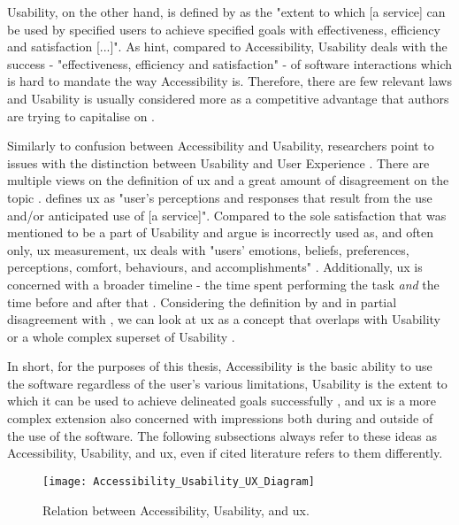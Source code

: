 Usability, on the other hand, is defined by \textcite{ISO_9241-11:2018} as the "extent to which [a service] can be used by specified users to achieve specified goals with effectiveness, efficiency and satisfaction [...]".
As \textcite{Wegge_Zimmermann_2007} hint, compared to Accessibility, Usability deals with the success - "effectiveness, efficiency and satisfaction" \parencite{ISO_9241-11:2018} - of software interactions which is hard to mandate the way Accessibility is.
Therefore, there are few relevant laws and Usability is usually considered more as a competitive advantage that authors are trying to capitalise on \parencite{Wegge_Zimmermann_2007}.

Similarly to confusion between Accessibility and Usability, researchers point to issues with the distinction between Usability and User Experience \parencite{Darin_et_all_2019, Juergen_et_all_2020}.
There are multiple views on the definition of \gls{ux} and a great amount of disagreement on the topic \parencite{Juergen_et_all_2020}.
\textcite{ISO_9241-11:2018} defines \gls{ux} as "user’s perceptions and responses that result from the use and/or anticipated use of [a service]".
Compared to the sole satisfaction that was mentioned to be a part of Usability and \textcite{Darin_et_all_2019} argue is incorrectly used as, and often only, \gls{ux} measurement, \gls{ux} deals with "users’ emotions, beliefs, preferences, perceptions, comfort, behaviours, and accomplishments" \parencite{ISO_9241-11:2018}.
Additionally, \gls{ux} is concerned with a broader timeline - the time spent performing the task \emph{and} the time before and after that \parencite{Juergen_et_all_2020,ISO_9241-11:2018}.
Considering the definition by \textcite{ISO_9241-11:2018} and in partial disagreement with \textcite{Darin_et_all_2019}, we can look at \gls{ux} as a concept that overlaps with Usability or a whole complex superset of Usability \parencite{Juergen_et_all_2020}.

In short, for the purposes of this thesis, Accessibility is the basic ability to use the software regardless of the user's various limitations, Usability is the extent to which it can be used to achieve delineated goals successfully \parencite{ISO_9241-11:2018}, and \gls{ux} is a more complex extension also concerned with impressions both during and outside of the use of the software.
The following subsections always refer to these ideas as Accessibility, Usability, and \gls{ux}, even if cited literature refers to them differently.

\begin{figure}[H]
    \centering
    \texttt{[image: Accessibility\_Usability\_UX\_Diagram]}
    \caption{Relation between Accessibility, Usability, and \gls{ux}.}
    \label{fig:hsie-relations}
\end{figure}

